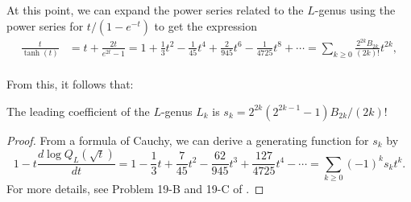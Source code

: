 At this point, we can expand the power series related to the $L$-genus using the power series for $t/(1-e^{-t})$ to get the expression
\begin{equation}\label{eq:tanh_series}
	\begin{aligned}
		\frac{t}{\tanh(t)} &= t+\frac{2t}{e^{2t}-1}= 1+\frac{1}{3}t^2-\frac{1}{45}t^4+\frac{2}{945}t^6 - \frac{1}{4725}t^8 +\cdots = \sum_{k\geq 0}\frac{2^{2k}B_{2k}}{(2k)!}t^{2k},\\
	\end{aligned}
\end{equation}

From this, it follows that:

\begin{proposition}\label{prop:leading_coefficient_L_genus}
	The leading coefficient of the $L$-genus $L_k$ is $s_k=2^{2k}(2^{2k-1}-1)B_{2k}/(2k)!$
\end{proposition}
\begin{proof}
	From a formula of Cauchy, we can derive a generating function for $s_k$ by
	\[
		1-t\frac{d\log Q_L(\sqrt{t})}{dt} = 1-\frac{1}{3}t + \frac{7}{45}t^2-\frac{62}{945}t^3+\frac{127}{4725}t^4-\cdots = \sum_{k\geq 0} (-1)^{k}s_k t^k.
	\]
	For more details, see Problem 19-B and 19-C of \cite{milnorstasheff1974}.
\end{proof}
